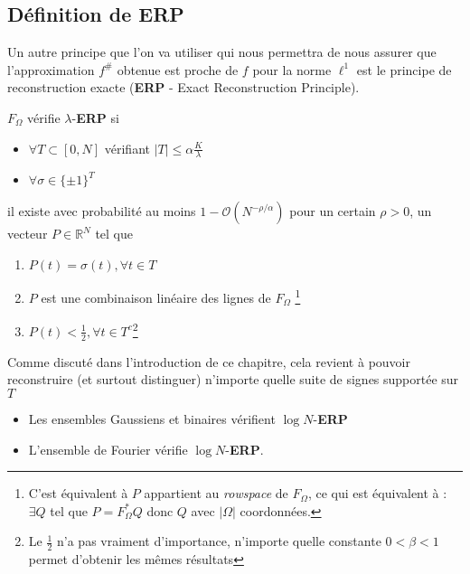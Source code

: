 \subsection{Définition de \textbf{ERP}}
Un autre principe que l'on va utiliser qui nous permettra de nous assurer que l'approximation $f^\#$ obtenue est proche de $f$ pour la norme $\ell^1$ est le principe de reconstruction exacte (\textbf{ERP} - Exact Reconstruction Principle).
\begin{definition}
	$F_\Omega$ vérifie $\lambda$-\textbf{ERP} si
	\begin{itemize}
		\item $\forall T \subset [0, N]$ vérifiant $|T| \leq \alpha \frac{K}{\lambda}$
		\item $\forall \sigma \in \{\pm 1\}^T$
	\end{itemize}
	il existe avec probabilité au moins $1-\mathcal{O}(N^{-\rho / \alpha})$ pour un certain $\rho>0$, un vecteur $P\in \mathbb{R}^N$ tel que
	\begin{enumerate}
		\item $P(t) = \sigma(t), \forall t \in T$
		\item $P$ est une combinaison linéaire des lignes de $F_\Omega$ \footnote{ C'est équivalent à $P$ appartient au \textit{rowspace} de $F_\Omega$, ce qui est équivalent à : $\exists Q$ tel que $P = F_\Omega ^* Q$ donc $Q$ avec $|\Omega|$ coordonnées.}
		\item $P(t) < \frac{1}{2}, \forall t \in T^c$\footnote{Le $\frac{1}{2}$ n'a pas vraiment d'importance, n'importe quelle constante $0 < \beta < 1$ permet d'obtenir les mêmes résultats} 
	\end{enumerate}
\end{definition}
Comme discuté dans l'introduction de ce chapitre, cela revient à pouvoir reconstruire (et surtout distinguer) n'importe quelle suite de signes supportée sur $T$
\begin{proposition} 
	\begin{itemize}
		\item Les ensembles Gaussiens et binaires vérifient $\log N$-\textbf{ERP}
		\item L'ensemble de Fourier vérifie $\log N$-\textbf{ERP}.
	\end{itemize}
\end{proposition}

